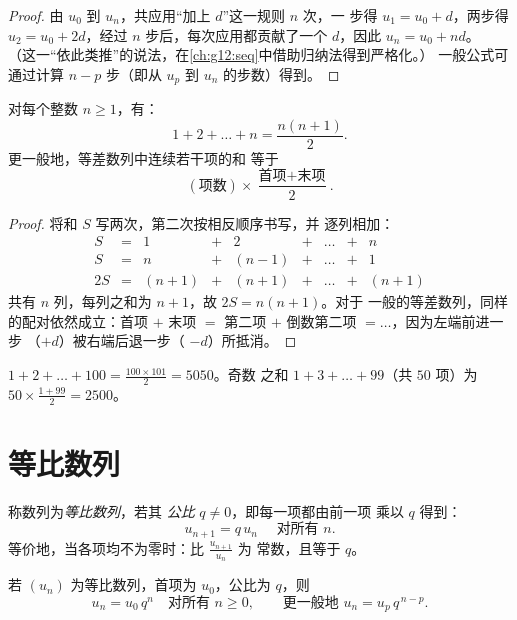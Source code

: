 \begin{proof}
由 $u_0$ 到 $u_n$，共应用“加上 $d$”这一规则 $n$ 次，一
步得 $u_1 = u_0 + d$，两步得 $u_2 = u_0 + 2d$，经过 $n$
步后，每次应用都贡献了一个 $d$，因此 $u_n = u_0 + nd$。
（这一“依此类推”的说法，在\cref{ch:g12:seq}中借助归纳法得到严格化。）
一般公式可通过计算 $n - p$ 步（即从 $u_p$ 到
$u_n$ 的步数）得到。
\end{proof}

\begin{theorem}[连续整数之和]\label{thm:g11:seq:intsum}
对每个整数 $n \geq 1$，有：
\[
1 + 2 + \dots + n = \frac{n(n+1)}{2}.
\]
更一般地，等差数列中连续若干项的和
等于
\[
(\text{项数}) \times
\frac{\text{首项} + \text{末项}}{2}.
\]
\end{theorem}

\begin{proof}
将和 $S$ 写两次，第二次按相反顺序书写，并
逐列相加：
\[
\begin{array}{ccccccccc}
S & = & 1 & + & 2 & + & \dots & + & n\\
S & = & n & + & (n-1) & + & \dots & + & 1\\
\hline
2S & = & (n+1) & + & (n+1) & + & \dots & + & (n+1)
\end{array}
\]
共有 $n$ 列，每列之和为 $n + 1$，故 $2S = n(n+1)$。对于
一般的等差数列，同样的配对依然成立：首项 $+$ 末项 $=$
第二项 $+$ 倒数第二项 $= \dots$，因为左端前进一步
（$+d$）被右端后退一步（
$-d$）所抵消。
\end{proof}

\begin{example}
$1 + 2 + \dots + 100 = \frac{100 \times 101}{2} = 5050$。奇数
之和 $1 + 3 + \dots + 99$（共 $50$ 项）为
$50 \times \frac{1 + 99}{2} = 2500$。
\end{example}

\section{等比数列}

\begin{definition}[等比数列]\label{def:g11:seq:geometric}
称数列为\emph{等比数列}，若其
\emph{公比} $q \neq 0$，即每一项都由前一项
乘以 $q$ 得到：
\[
u_{n+1} = q\,u_n \quad \text{ 对所有 } n.
\]
等价地，当各项均不为零时：比 $\frac{u_{n+1}}{u_n}$ 为
常数，且等于 $q$。
\end{definition}

\begin{theorem}[通项公式]\label{thm:g11:seq:geomgeneral}
若 $(u_n)$ 为等比数列，首项为 $u_0$，公比为 $q$，则
\[
u_n = u_0\, q^n \quad \text{对所有 } n \geq 0,
\qquad\text{更一般地 } u_n = u_p\, q^{\,n-p} .
\]
\end{theorem}


